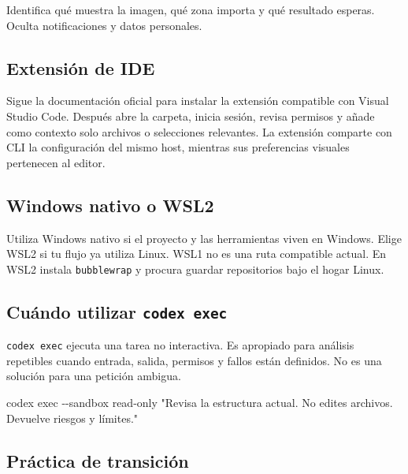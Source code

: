 \documentclass[10pt,a4paper,openany]{book}
\newenvironment{Shaded}{}{}
\newcommand{\AttributeTok}[1]{\textcolor[rgb]{0.49,0.56,0.16}{#1}}
\newcommand{\ExtensionTok}[1]{#1}
\newcommand{\NormalTok}[1]{#1}
\newcommand{\StringTok}[1]{\textcolor[rgb]{0.25,0.44,0.63}{#1}}
\renewenvironment{Shaded}
  {\begin{tcolorbox}[
    enhanced,
    breakable,
    colback=CodeBg,
    colframe=Border,
    boxrule=0.5pt,
    arc=2mm,
    left=3mm,
    right=3mm,
    top=2.2mm,
    bottom=2.2mm,
    before skip=0.8em,
    after skip=0.9em
  ]}
  {\end{tcolorbox}}
\begin{document}
Identifica qué muestra la imagen, qué zona importa y qué resultado
esperas. Oculta notificaciones y datos personales.

\subsection{Extensión de IDE}\label{extensiuxf3n-de-ide}

Sigue la documentación oficial para instalar la extensión compatible con
Visual Studio Code. Después abre la carpeta, inicia sesión, revisa
permisos y añade como contexto solo archivos o selecciones relevantes.
La extensión comparte con CLI la configuración del mismo host, mientras
sus preferencias visuales pertenecen al editor.

\subsection{Windows nativo o WSL2}\label{windows-nativo-o-wsl2}

Utiliza Windows nativo si el proyecto y las herramientas viven en
Windows. Elige WSL2 si tu flujo ya utiliza Linux. WSL1 no es una ruta
compatible actual. En WSL2 instala \texttt{bubblewrap} y procura guardar
repositorios bajo el hogar Linux.

\subsection{\texorpdfstring{Cuándo utilizar
\texttt{codex\ exec}}{Cuándo utilizar codex exec}}\label{cuuxe1ndo-utilizar-codex-exec}

\texttt{codex\ exec} ejecuta una tarea no interactiva. Es apropiado para
análisis repetibles cuando entrada, salida, permisos y fallos están
definidos. No es una solución para una petición ambigua.

\begin{Shaded}
\begin{Highlighting}[]
\ExtensionTok{codex}\NormalTok{ exec }\AttributeTok{{-}{-}sandbox}\NormalTok{ read{-}only }\StringTok{"Revisa la estructura actual. No edites archivos. Devuelve riesgos y límites."}
\end{Highlighting}
\end{Shaded}

\subsection{Práctica de transición}\label{pruxe1ctica-de-transiciuxf3n}
\end{document}
